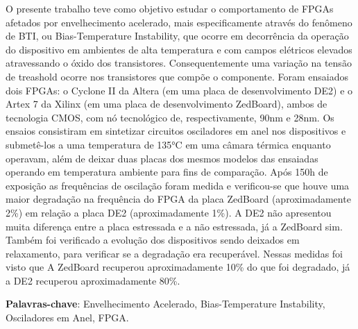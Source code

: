 \begin{resumo}[Resumo]
O presente trabalho teve como objetivo estudar o comportamento de FPGAs afetados por envelhecimento acelerado, mais especificamente através do fenômeno de BTI, ou Bias-Temperature Instability, que ocorre em decorrência da operação do dispositivo em ambientes de alta temperatura e com campos elétricos elevados atravessando o óxido dos transistores. Consequentemente uma variação na tensão de treashold ocorre nos transistores que compõe o componente. Foram ensaiados dois FPGAs: o Cyclone II da Altera (em uma placa de desenvolvimento DE2) e o Artex 7 da Xilinx (em uma placa de desenvolvimento ZedBoard), ambos de tecnologia CMOS, com nó tecnológico de, respectivamente, 90nm e 28nm. Os ensaios consistiram em sintetizar circuitos osciladores em anel nos dispositivos e submetê-los a uma temperatura de 135°C em uma câmara térmica enquanto operavam, além de deixar duas placas dos mesmos modelos das ensaiadas operando em temperatura ambiente para fins de comparação. Após 150h de exposição as frequências de oscilação foram medida e verificou-se que houve uma maior degradação na frequência do FPGA da placa ZedBoard (aproximadamente 2\%) em relação a placa DE2 (aproximadamente 1\%). A DE2 não apresentou muita diferença entre a placa estressada e a não estressada, já a ZedBoard sim. Também foi verificado a evolução dos dispositivos sendo deixados em relaxamento, para verificar se a degradação era recuperável. Nessas medidas foi visto que A ZedBoard recuperou aproximadamente 10\% do que foi degradado, já a DE2 recuperou aproximadamente 80\%.


    \vspace{\onelineskip}
	\noindent
        
	\textbf{Palavras-chave}: Envelhecimento Acelerado, Bias-Temperature Instability, Osciladores em Anel, FPGA.

\end{resumo}

\setlength{\absparsep}{18pt} 

